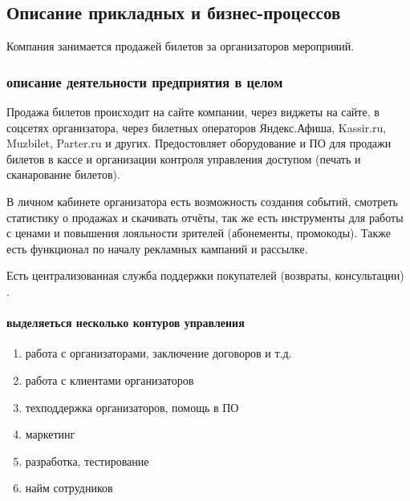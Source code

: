 \documentclass{article}
\begin{document}

\subsection{Описание прикладных и бизнес-процессов}

Компания занимается продажей билетов за организаторов мероприяий.


\subsubsection{описание деятельности предприятия в целом}
Продажа билетов происходит на сайте компании, через виджеты на сайте, в соцсетях организатора,
через билетных операторов Яндекс.Афиша, Kassir.ru, Muzbilet, Parter.ru и других.
Предостовляет оборудование и ПО для продажи билетов в кассе
и организации контроля управления доступом (печать и сканарование билетов).

В личном кабинете организатора есть возможность создания событий,
смотреть статистику о продажах и скачивать отчёты, так же есть
инструменты для работы с ценами и повышения лояльности зрителей (абонементы, промокоды).
Также есть функционал по началу рекламных кампаний и рассылке.

Есть централизованная служба поддержки покупателей (возвраты, консультации) \cite{radario}.

\paragraph{выделяеться несколько контуров управления}
\begin{enumerate}
    \item{работа с организаторами, заключение договоров и т.д.}
    \item{работа с клиентами организаторов}
    \item{техподдержка организаторов, помощь в ПО}
    \item{маркетинг}
    \item{разработка, тестирование}
    \item{найм сотрудников}
\end{enumerate}
\end{document}

